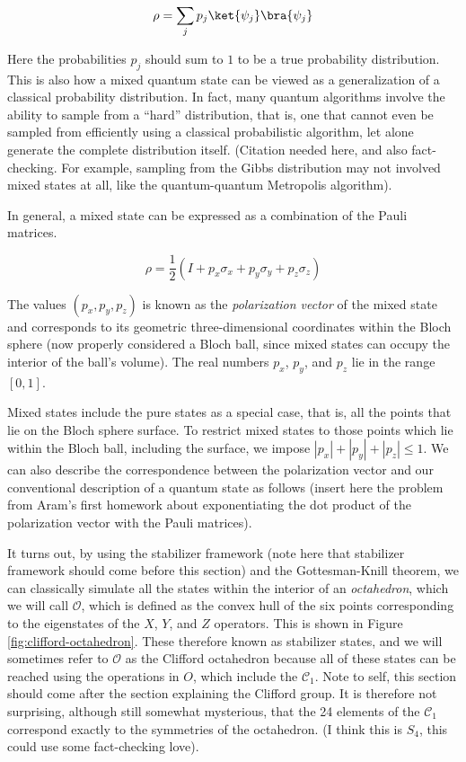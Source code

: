 \begin{displaymath}
\rho = \sum_{j} p_j \ket{\psi_j}\bra{\psi_j}
\end{displaymath}

Here the probabilities $p_j$ should sum to $1$ to be a true probability
distribution. This is also how a mixed quantum state can be viewed as a
generalization of a classical probability distribution. In fact, many
quantum algorithms involve the ability to sample from a ``hard'' distribution,
that is, one that cannot even be sampled from efficiently using a classical
probabilistic algorithm, let alone generate the complete distribution itself.
(Citation needed here, and also fact-checking. For example, sampling from
the Gibbs distribution may not involved mixed states at all, like the
quantum-quantum Metropolis algorithm).

In general, a mixed state can be expressed as a combination of the Pauli
matrices.

\begin{displaymath}
\rho = \frac{1}{2}(I + p_x\sigma_x + p_y\sigma_y + p_z\sigma_z)
\end{displaymath}

The values $(p_x, p_y, p_z)$ is known as the \emph{polarization vector} of
the mixed state and corresponds to its geometric three-dimensional coordinates
within the Bloch sphere (now properly considered a Bloch ball, since mixed
states can occupy the interior of the ball's volume). The real numbers
$p_x$, $p_y$, and $p_z$ lie in the range $[0,1]$.

Mixed states include the pure states as a special case, that is, all the
points that lie on the Bloch sphere surface. To restrict mixed states
to those points which lie within the Bloch ball, including the surface,
we impose $|p_x| + |p_y| + |p_z| \le 1$. We can also describe the
correspondence between the polarization vector and our conventional
description of a quantum state as follows (insert here the problem from
Aram's first homework about exponentiating the dot product of the polarization
vector with the Pauli matrices).

It turns out, by using the stabilizer framework (note here that stabilizer
framework should come before this section) and the Gottesman-Knill theorem,
we can classically simulate all the states within the interior of an
\emph{octahedron}, which we will call $\mathcal{O}$, which is defined as the
convex hull of the six points corresponding to the eigenstates of the
$X$, $Y$, and $Z$ operators.
This is shown in Figure \ref{fig:clifford-octahedron}.
These therefore known as stabilizer states, and we will sometimes refer to
$\mathcal{O}$ as the Clifford octahedron because all of these states can be
reached using the operations in $O$, which include the $\mathcal{C}_1$.
Note to self, this section should come after the section explaining the
Clifford group. It is therefore not surprising, although still somewhat
mysterious, that the 24 elements of the $\mathcal{C}_1$ correspond
exactly to the symmetries of the octahedron. (I think this is $S_4$, this
could use some fact-checking love).

